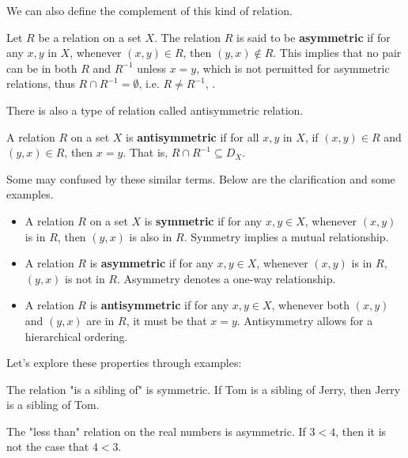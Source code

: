 We can also define the complement of this kind of relation.
\begin{definition}
	Let \( R \) be a relation on a set \( X \). The relation \( R \) is said to be \textbf{asymmetric} if for any \( x, y \) in \( X \), whenever \( (x, y) \in R \), then \( (y, x) \notin R \). This implies that no pair can be in both \( R \) and \( R^{-1} \) unless \( x = y \), which is not permitted for asymmetric relations, thus \( R \cap R^{-1} = \emptyset \), i.e. $R \neq R^{-1}$, .
\end{definition}
There is also a type of relation called antisymmetric relation.
\begin{definition}
	A relation \( R \) on a set \( X \) is \textbf{antisymmetric} if for all \( x, y \) in \( X \), if \( (x, y) \in R \) and \( (y, x) \in R \), then \( x = y \). That is, \( R \cap R^{-1} \subseteq D_X \).
\end{definition}
Some may confused by these similar terms. Below are the clarification and some examples.
\begin{itemize}
	\item A relation \( R \) on a set \( X \) is \textbf{symmetric} if for any \( x, y \in X \), whenever \( (x, y) \) is in \( R \), then \( (y, x) \) is also in \( R \). Symmetry implies a mutual relationship.
	
	\item A relation \( R \) is \textbf{asymmetric} if for any \( x, y \in X \), whenever \( (x, y) \) is in \( R \), \( (y, x) \) is not in \( R \). Asymmetry denotes a one-way relationship.
	
	\item A relation \( R \) is \textbf{antisymmetric} if for any \( x, y \in X \), whenever both \( (x, y) \) and \( (y, x) \) are in \( R \), it must be that \( x = y \). Antisymmetry allows for a hierarchical ordering.
\end{itemize}

Let's explore these properties through examples:

\begin{example}
	The relation "is a sibling of" is symmetric. If Tom is a sibling of Jerry, then Jerry is a sibling of Tom.
\end{example}

\begin{example}
	The "less than" relation on the real numbers is asymmetric. If \( 3 < 4 \), then it is not the case that \( 4 < 3 \).
\end{example}

